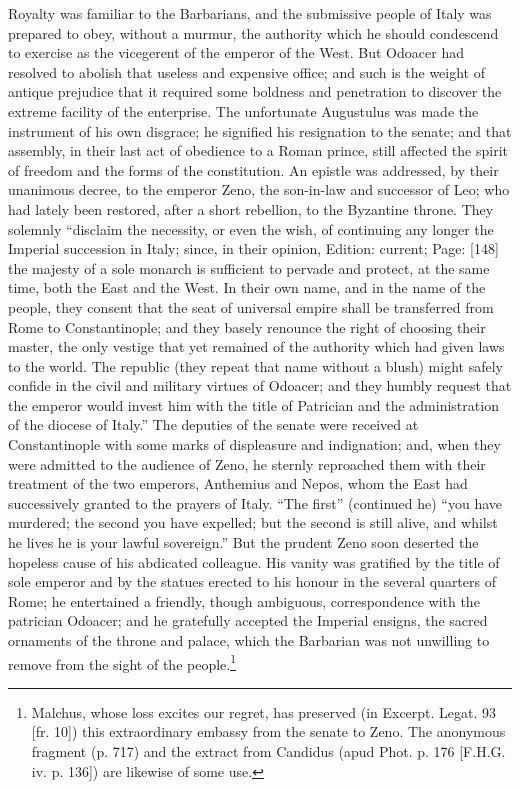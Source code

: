 Royalty was familiar to the Barbarians, and the submissive people of Italy was prepared to obey, without a murmur, the authority which he should condescend to exercise as the vicegerent of the emperor of the West. But Odoacer had resolved to abolish that useless and expensive office; and such is the weight of antique prejudice that it required some boldness and penetration to discover the extreme facility of the enterprise. The unfortunate Augustulus was made the instrument of his own disgrace; he signified his resignation to the senate; and that assembly, in their last act of obedience to a Roman prince, still affected the spirit of freedom and the forms of the constitution. An epistle was addressed, by their unanimous decree, to the emperor Zeno, the son-in-law and successor of Leo; who had lately been restored, after a short rebellion, to the Byzantine throne. They solemnly \texthebrew{“}disclaim the necessity, or even the wish, of continuing any longer the Imperial succession in Italy; since, in their opinion, Edition: current; Page: [148] the majesty of a sole monarch is sufficient to pervade and protect, at the same time, both the East and the West. In their own name, and in the name of the people, they consent that the seat of universal empire shall be transferred from Rome to Constantinople; and they basely renounce the right of choosing their master, the only vestige that yet remained of the authority which had given laws to the world. The republic (they repeat that name without a blush) might safely confide in the civil and military virtues of Odoacer; and they humbly request that the emperor would invest him with the title of Patrician and the administration of the diocese of Italy.\texthebrew{}” The deputies of the senate were received at Constantinople with some marks of displeasure and indignation; and, when they were admitted to the audience of Zeno, he sternly reproached them with their treatment of the two emperors, Anthemius and Nepos, whom the East had successively granted to the prayers of Italy. \texthebrew{“}The first\texthebrew{}” (continued he) \texthebrew{“}you have murdered; the second you have expelled; but the second is still alive, and whilst he lives he is your lawful sovereign.\texthebrew{}” But the prudent Zeno soon deserted the hopeless cause of his abdicated colleague. His vanity was gratified by the title of sole emperor and by the statues erected to his honour in the several quarters of Rome; he entertained a friendly, though ambiguous, correspondence with the patrician Odoacer; and he gratefully accepted the Imperial ensigns, the sacred ornaments of the throne and palace, which the Barbarian was not unwilling to remove from the sight of the people.\footnote{Malchus, whose loss excites our regret, has preserved (in Excerpt. Legat. 93 [fr. 10]) this extraordinary embassy from the senate to Zeno. The anonymous fragment (p. 717) and the extract from Candidus (apud Phot. p. 176 [F.H.G. iv. p. 136]) are likewise of some use.}

